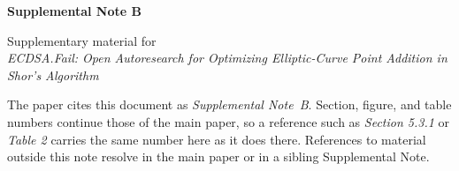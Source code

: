 \documentclass[envcountsame,runningheads,notitlepage]{llncs}
\begin{document}
\begin{center}
  {\large\bfseries Supplemental Note B\par}
  \vspace{0.9em}
  {\small Supplementary material for\\[0.25em]
   \emph{ECDSA.Fail: Open Autoresearch for Optimizing Elliptic-Curve Point Addition in Shor's Algorithm}\\[1.0em]
   \begin{minipage}{0.86\linewidth}\small\itshape\raggedright
   The paper cites this document as \emph{Supplemental Note~B}.
   Section, figure, and table numbers continue those of the main paper, so a
   reference such as \emph{Section 5.3.1} or \emph{Table 2} carries the same
   number here as it does there. References to material outside this note
   resolve in the main paper or in a sibling Supplemental Note.
   \end{minipage}\par}
\end{center}
\vspace{1.5em}
\appendix
\setcounter{section}{1}



\end{document}

